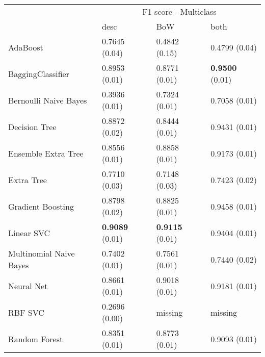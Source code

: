 \begin{tabular}{|l|l|l|l| }
\hline
 &  \multicolumn{3}{c|}{ F1 score - Multiclass} \\
\cline{2-4} & desc & BoW & both \\ \hline
AdaBoost                & 0.7645 (0.04) & 0.4842 (0.15) & 0.4799 (0.04)\\
BaggingClassifier       & 0.8953 (0.01) & 0.8771 (0.01) & {\bf 0.9500} (0.01)\\
Bernoulli Naive Bayes   & 0.3936 (0.01) & 0.7324 (0.01) & 0.7058 (0.01)\\
Decision Tree           & 0.8872 (0.02) & 0.8444 (0.01) & 0.9431 (0.01)\\
Ensemble Extra Tree     & 0.8556 (0.01) & 0.8858 (0.01) & 0.9173 (0.01)\\
Extra Tree              & 0.7710 (0.03) & 0.7148 (0.03) & 0.7423 (0.02)\\
Gradient Boosting       & 0.8798 (0.02) & 0.8825 (0.01) & 0.9458 (0.01)\\
Linear SVC              & {\bf 0.9089} (0.01) & {\bf 0.9115} (0.01) & 0.9404 (0.01)\\
Multinomial Naive Bayes & 0.7402 (0.01) & 0.7561 (0.01) & 0.7440 (0.02)\\
Neural Net              & 0.8661 (0.01) & 0.9018 (0.01) & 0.9181 (0.01)\\
RBF SVC                 & 0.2696 (0.00) & missing  & missing \\
Random Forest           & 0.8351 (0.01) & 0.8773 (0.01) & 0.9093 (0.01)\\
\hline
\end{tabular}